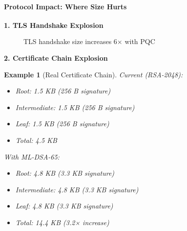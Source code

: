 \documentclass[11pt,a4paper]{article}
\newtheorem{example}{Example}
\begin{document}
\paragraph{Protocol Impact: Where Size Hurts}

\textbf{1. TLS Handshake Explosion}

\begin{figure}[h]
\centering
{}
\caption{TLS handshake size increases 6× with PQC}
\end{figure}

\textbf{2. Certificate Chain Explosion}

\begin{example}[Real Certificate Chain]
Current (RSA-2048):
\begin{itemize}
    \item Root: 1.5 KB (256 B signature)
    \item Intermediate: 1.5 KB (256 B signature)  
    \item Leaf: 1.5 KB (256 B signature)
    \item Total: 4.5 KB
\end{itemize}

With ML-DSA-65:
\begin{itemize}
    \item Root: 4.8 KB (3.3 KB signature)
    \item Intermediate: 4.8 KB (3.3 KB signature)
    \item Leaf: 4.8 KB (3.3 KB signature)
    \item Total: 14.4 KB (3.2× increase)
\end{itemize}
\end{example}
\end{document}
